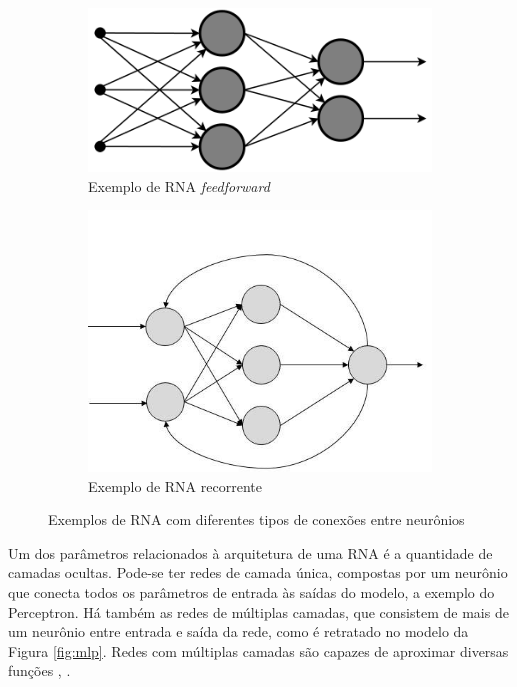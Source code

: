 \begin{figure}
	\begin{subfigure}[h]{0.3\linewidth}
		\includegraphics[width=\linewidth]{img/feedforward}
		\caption{Exemplo de RNA \emph{feedforward}}
		\label{fig:feedforward}
	\end{subfigure}
	\hfill
	\begin{subfigure}[h]{0.4\linewidth}
		\includegraphics[width=\linewidth]{img/recorrente}
		\caption{Exemplo de RNA recorrente}
		\label{fig:recorrente}
	\end{subfigure}%
	\caption{Exemplos de RNA com diferentes tipos de conexões entre neurônios}
	\label{fig:rna_conectividade}
\end{figure}

Um dos parâmetros relacionados à arquitetura de uma RNA é a quantidade de camadas ocultas. Pode-se ter redes de camada única, compostas por um neurônio que conecta todos os parâmetros de entrada às saídas do modelo, a exemplo do Perceptron. Há também as redes de múltiplas camadas, que consistem de mais de um neurônio entre entrada e saída da rede, como é retratado no modelo da Figura \ref{fig:mlp}. Redes com múltiplas camadas são capazes de aproximar diversas funções \cite{hornik1991approximation}, \cite{braga2000redes}.

